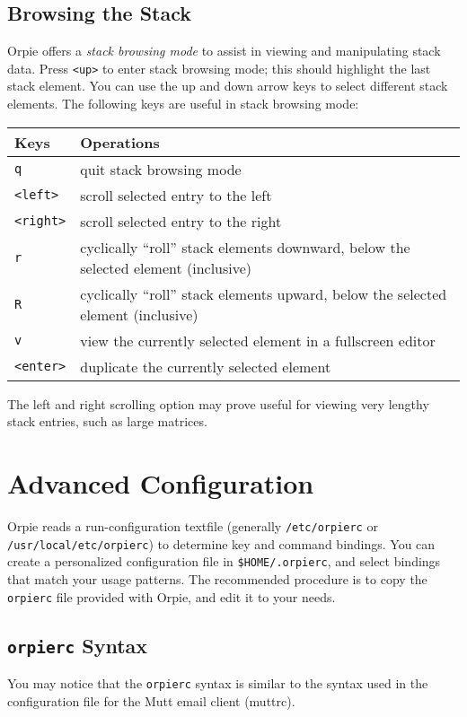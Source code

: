 \documentclass[11pt,notitlepage]{article}
\begin{document}
\subsection{Browsing the Stack}
Orpie offers a {\em stack browsing mode} to assist in viewing and manipulating
stack data.  Press {\tt <up>} to enter stack browsing mode; this should
highlight the last stack element.  You can use the up and down arrow keys to
select different stack elements.  The following keys are useful in stack
browsing mode:
\begin{center}
   \begin{tabular}[t]{|l|l|}
      \hline Keys & Operations \\
      \hline
      {\tt q} & quit stack browsing mode \\
      {\tt <left>} & scroll selected entry to the left \\
      {\tt <right>} & scroll selected entry to the right \\
      {\tt r} & cyclically ``roll'' stack elements downward, below the 
               selected element (inclusive) \\
      {\tt R} & cyclically ``roll'' stack elements upward, below the selected
               element (inclusive) \\
      {\tt v} & view the currently selected element in a fullscreen editor \\
      {\tt <enter>} & duplicate the currently selected element \\
      \hline
   \end{tabular}
\end{center}

The left and right scrolling option may prove useful for viewing very lengthy
stack entries, such as large matrices.

\section{Advanced Configuration}
\label{advanced}
Orpie reads a run-configuration textfile (generally {\tt /etc/orpierc} or
{\tt /usr/local/etc/orpierc}) to determine key and command bindings.  You can
create a personalized configuration file in {\tt \$HOME/.orpierc}, and select
bindings that match your usage patterns.  The recommended procedure is to copy
the {\tt orpierc} file provided with Orpie, and edit it to your needs.

\subsection{{\tt orpierc} Syntax}
You may notice that the  {\tt orpierc} syntax is similar to the syntax used in
the configuration file for the Mutt email client (muttrc).
\end{document}
